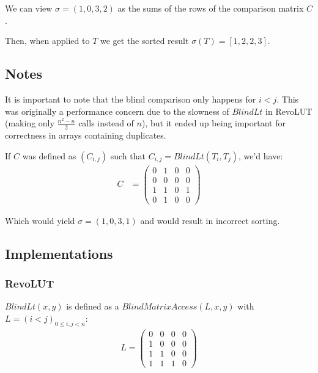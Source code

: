 \documentclass{article}
\begin{document}
We can view $\sigma = (1, 0, 3, 2)$ as the sums of the rows of the comparison matrix $C$.

Then, when applied to $T$ we get the sorted result $\sigma(T) = [1, 2, 2, 3]$.

\subsection*{Notes}

It is important to note that the blind comparison only happens for $i < j$. This was originally a performance concern due to the slowness of $BlindLt$ in RevoLUT (making only $\frac{n^2-n}{2}$ calls instead of $n$), but it ended up being important for correctness in arrays containing duplicates.

If $C$ was defined as $(C_{i, j})$ such that $C_{i, j} = BlindLt(T_i, T_j)$, we'd have:
\begin{align*}
    C &= \begin{pmatrix}
        0 & 1 & 0 & 0 \\
        0 & 0 & 0 & 0 \\
        1 & 1 & 0 & 1 \\
        0 & 1 & 0 & 0
    \end{pmatrix}
\end{align*}

Which would yield $\sigma = (1, 0, 3, 1)$ and would result in incorrect sorting.

\newpage

\subsection{Implementations}

\subsubsection*{RevoLUT}

$BlindLt(x, y)$ is defined as a $BlindMatrixAccess(L, x, y)$ with $L = {(i < j)}_{0 \leq i, j< n}$:
\begin{align*}
    L = \begin{pmatrix}
        0 & 0 & 0 & 0 \\
        1 & 0 & 0 & 0 \\
        1 & 1 & 0 & 0 \\
        1 & 1 & 1 & 0
    \end{pmatrix}
\end{align*}
\end{document}
